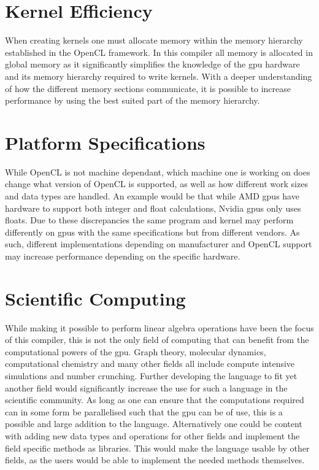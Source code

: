 \section{Kernel Efficiency}
When creating kernels one must allocate memory within the memory hierarchy established in the OpenCL framework.
In this compiler all memory is allocated in global memory as it significantly simplifies the knowledge of the \acrshort{gpu} hardware and its memory hierarchy required to write kernels.
With a deeper understanding of how the different memory sections communicate, it is possible to increase performance by using the best suited part of the memory hierarchy. \citep{ocl_lecture3}

\section{Platform Specifications}
While OpenCL is not machine dependant, which machine one is working on does change what version of OpenCL is supported, as well as how different work sizes and data types are handled.
An example would be that while AMD \acrshort{gpu}s have hardware to support both integer and float calculations, Nvidia \acrshort{gpu}s only uses floats. \citep{CUDAOpenCLOptimisation}
Due to these discrepancies the same program and kernel may perform differently on \acrshort{gpu}s with the same specifications but from different vendors.
As such, different implementations depending on manufacturer and OpenCL support may increase performance depending on the specific hardware.

\section{Scientific Computing}
While making it possible to perform linear algebra operations have been the focus of this compiler, this is not the only field of computing that can benefit from the computational powers of the \acrshort{gpu}.
Graph theory, molecular dynamics, computational chemistry and many other fields all include compute intensive simulations and number crunching.
Further developing the language to fit yet another field would significantly increase the use for such a language in the scientific community.
As long as one can ensure that the computations required can in some form be parallelised such that the \acrshort{gpu} can be of use, this is a possible and large addition to the language.
Alternatively one could be content with adding new data types and operations for other fields and implement the field specific methods as libraries.
This would make the language usable by other fields, as the users would be able to implement the needed methods themselves.

